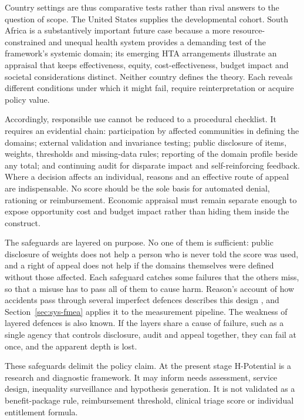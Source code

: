 Country settings are thus comparative tests rather than rival answers to the
question of scope. The United States supplies the developmental cohort. South
Africa is a substantively important future case because a more resource-
constrained and unequal health system provides a demanding test of the
framework's systemic domain; its emerging HTA arrangements illustrate an
appraisal that keeps effectiveness, equity, cost-effectiveness, budget impact
and societal considerations distinct. \citep{south_africa_hta_2026} Neither
country defines the theory. Each reveals different conditions under which it
might fail, require reinterpretation or acquire policy value.

Accordingly, responsible use cannot be reduced to a procedural checklist. It
requires an evidential chain: participation by affected communities in defining
the domains; external validation and invariance testing; public disclosure of
items, weights, thresholds and missing-data rules; reporting of the domain
profile beside any total; and continuing audit for disparate impact and
self-reinforcing feedback. Where a decision affects an individual, reasons and
an effective route of appeal are indispensable. No score should be the sole
basis for automated denial, rationing or reimbursement. Economic appraisal must
remain separate enough to expose opportunity cost and budget impact rather than
hiding them inside the construct.

The safeguards are layered on purpose. No one of them is sufficient: public
disclosure of weights does not help a person who is never told the score was
used, and a right of appeal does not help if the domains themselves were
defined without those affected. Each safeguard catches some failures that the
others miss, so that a misuse has to pass all of them to cause harm. Reason's
account of how accidents pass through several imperfect defences describes
this design \citep{reason_1990}, and Section~\ref{sec:sys-fmea} applies it to
the measurement pipeline. The weakness of layered defences is also known. If
the layers share a cause of failure, such as a single agency that controls
disclosure, audit and appeal together, they can fail at once, and the apparent
depth is lost.

These safeguards delimit the policy claim. At the present stage H-Potential is
a research and diagnostic framework. It may inform needs assessment, service
design, inequality surveillance and hypothesis generation. It is not validated
as a benefit-package rule, reimbursement threshold, clinical triage score or
individual entitlement formula.

